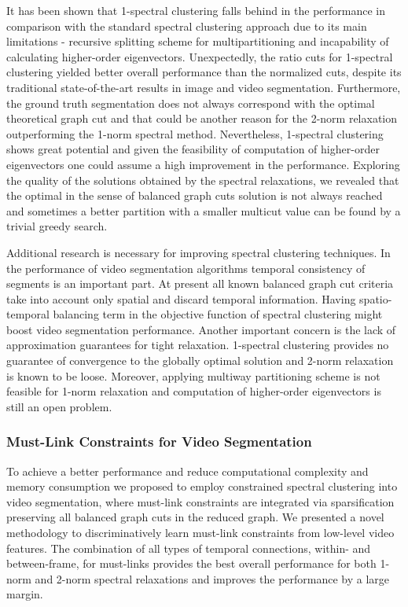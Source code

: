 It has been shown that 1-spectral clustering falls behind in the performance in comparison with the standard spectral clustering approach due to its main limitations - recursive splitting scheme for multipartitioning and incapability
of calculating higher-order eigenvectors. Unexpectedly, the ratio cuts for 1-spectral clustering yielded better overall performance than the normalized cuts, despite its traditional state-of-the-art results in image and video 
segmentation. Furthermore, the ground truth segmentation does not always correspond with the optimal theoretical graph cut and that could be another reason for the 2-norm relaxation outperforming the 1-norm spectral method.
Nevertheless, 1-spectral clustering shows great potential and given the feasibility of computation of higher-order eigenvectors one could assume a high improvement in the performance.
Exploring the quality of the solutions obtained by the spectral relaxations, we revealed that the optimal in the sense of balanced graph cuts solution is not always reached 
and sometimes a better partition with a smaller multicut value can be found by a trivial greedy search. 

Additional research is necessary for improving spectral clustering techniques. In the performance of video segmentation algorithms temporal consistency of segments is an important part.
At present all known balanced graph cut criteria take into account only spatial and discard temporal information. Having spatio-temporal balancing term in the objective function of spectral clustering
might boost video segmentation performance.
Another important concern is the lack of approximation guarantees for tight relaxation. 1-spectral clustering provides no guarantee of convergence to the globally optimal solution and 2-norm relaxation is known to be loose.
Moreover, applying multiway partitioning scheme is not feasible for 1-norm relaxation and computation of higher-order eigenvectors is still an open problem.
\subsubsection*{Must-Link Constraints for Video Segmentation}
To achieve a better performance and reduce computational complexity and memory consumption we proposed to employ constrained spectral clustering into video segmentation, 
where must-link constraints are integrated via sparsification preserving all balanced graph cuts in the reduced graph. We presented a novel methodology to discriminatively learn must-link constraints from low-level video features.
The combination of all types of temporal connections, within- and between-frame, for must-links provides the best overall performance for both 1-norm and 2-norm spectral relaxations and improves the performance by a large margin.

